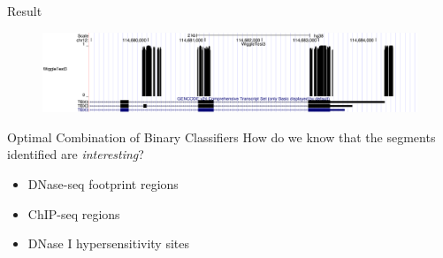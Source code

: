 \documentclass{beamer}
\begin{document}
    \begin{frame}{Result}
        \begin{figure}
            \centering
            \includegraphics[width=\textwidth]{WiggleTrack1.pdf}
            \label{fig:wiggle}
        \end{figure}
    \end{frame}
    
    
    \begin{frame}{Optimal Combination of Binary Classifiers}
        How do we know that the segments identified are \emph{interesting}? 
        
        \begin{itemize}
            \item DNase-seq footprint regions
            \item ChIP-seq regions
            \item DNase I hypersensitivity sites
        \end{itemize}
    \end{frame}
    
        
    
\end{document}
